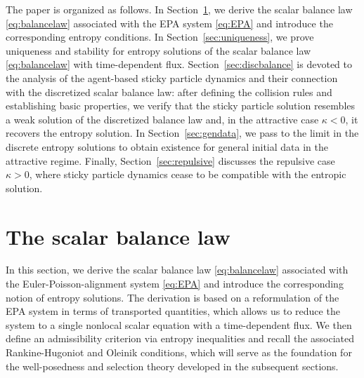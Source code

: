 \documentclass[11pt,reqno]{amsart}
\theoremstyle{definition}
\theoremstyle{remark}
\begin{document}
	
	The paper is organized as follows. 
	In Section~\ref{sec:balancelaw}, we derive the scalar balance law \eqref{eq:balancelaw} associated with the EPA system \eqref{eq:EPA} and introduce the corresponding entropy conditions. 
	In Section~\ref{sec:uniqueness}, we prove uniqueness and stability for entropy solutions of the scalar balance law \eqref{eq:balancelaw} with time-dependent flux.
	Section~\ref{sec:discbalance} is devoted to the analysis of the  agent-based sticky particle dynamics and their connection with the discretized scalar balance law: after defining the collision rules and establishing basic properties, we verify that the sticky particle solution resembles a weak solution of the discretized balance law and, in the attractive case $\kappa<0$, it recovers the entropy solution.
	In Section~\ref{sec:gendata}, we pass to the limit in the discrete entropy solutions to obtain existence for general initial data in the attractive regime. Finally, Section~\ref{sec:repulsive} discusses the repulsive case $\kappa>0$, where sticky particle dynamics cease to be compatible with the entropic solution.
	
	
	\section{The scalar balance law}\label{sec:balancelaw}
	In this section, we derive the scalar balance law \eqref{eq:balancelaw} associated with the Euler-Poisson-alignment system \eqref{eq:EPA} and introduce the corresponding notion of entropy solutions. The derivation is based on a reformulation of the EPA system in terms of transported quantities, which allows us to reduce the system to a single nonlocal scalar equation with a time-dependent flux. We then define an admissibility criterion via entropy inequalities and recall the associated Rankine-Hugoniot and Oleinik conditions, which will serve as the foundation for the well-posedness and selection theory developed in the subsequent sections.
	
\end{document}
